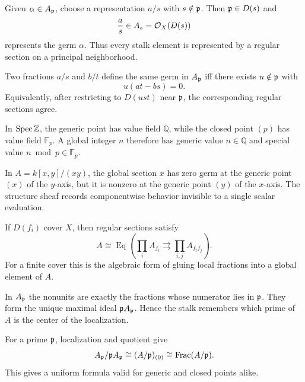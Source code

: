 \begin{example}
Given $\alpha\in A_{\mathfrak p}$, choose a representation $a/s$ with $s\notin\mathfrak p$.  Then $\mathfrak p\in D(s)$ and
\[
\frac as\in A_s=\mathcal O_X(D(s))
\]
represents the germ $\alpha$.  Thus every stalk element is represented by a regular section on a principal neighborhood.
\end{example}

\begin{example}
Two fractions $a/s$ and $b/t$ define the same germ in $A_{\mathfrak p}$ iff there exists $u\notin\mathfrak p$ with
\[
u(at-bs)=0.
\]
Equivalently, after restricting to $D(ust)$ near $\mathfrak p$, the corresponding regular sections agree.
\end{example}

\begin{example}
In $\operatorname{Spec}\mathbb Z$, the generic point has value field $\mathbb Q$, while the closed point $(p)$ has value field $\mathbb F_p$.  A global integer $n$ therefore has generic value $n\in\mathbb Q$ and special value $n\bmod p\in\mathbb F_p$.
\end{example}

\begin{example}
In $A=k[x,y]/(xy)$, the global section $x$ has zero germ at the generic point $(x)$ of the $y$-axis, but it is nonzero at the generic point $(y)$ of the $x$-axis.  The structure sheaf records componentwise behavior invisible to a single scalar evaluation.
\end{example}

\begin{example}
If $D(f_i)$ cover $X$, then regular sections satisfy
\[
A\cong\operatorname{Eq}\left(
\prod_i A_{f_i}\rightrightarrows\prod_{i,j}A_{f_if_j}
\right).
\]
For a finite cover this is the algebraic form of gluing local fractions into a global element of $A$.
\end{example}

\begin{example}
In $A_{\mathfrak p}$ the nonunits are exactly the fractions whose numerator lies in $\mathfrak p$.  They form the unique maximal ideal $\mathfrak p A_{\mathfrak p}$.  Hence the stalk remembers which prime of $A$ is the center of the localization.
\end{example}

\begin{example}
For a prime $\mathfrak p$, localization and quotient give
\[
A_{\mathfrak p}/\mathfrak p A_{\mathfrak p}
\cong (A/\mathfrak p)_{(0)}
\cong\operatorname{Frac}(A/\mathfrak p).
\]
This gives a uniform formula valid for generic and closed points alike.
\end{example}

